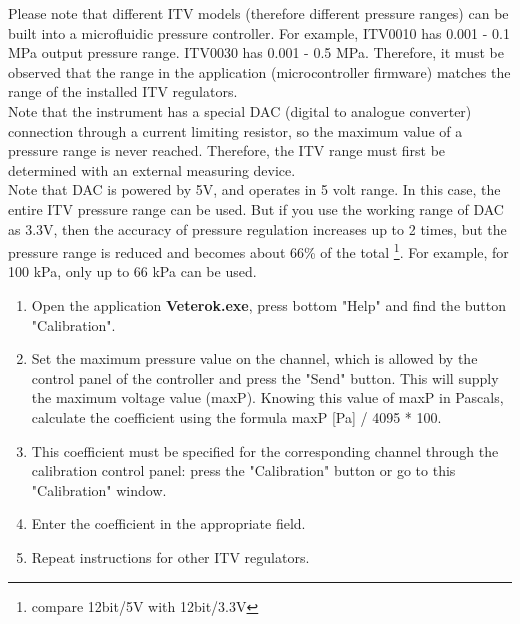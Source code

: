 \documentclass[twoside, 12pt, a4paper]{refart}
\begin{document}
    Please note that different ITV models (therefore different pressure ranges) can be built into a microfluidic pressure controller. For example, ITV0010 has 0.001 - 0.1 MPa output pressure range. ITV0030 has 0.001 - 0.5 MPa. Therefore, it must be observed that the range in the application (microcontroller firmware) matches the range of the installed ITV regulators.\\
    
    Note that the instrument has a special DAC (digital to analogue converter) connection through a current limiting resistor, so the maximum value of a pressure range is never reached. Therefore, the ITV range must first be determined with an external measuring device.\\
    
    Note that DAC is powered by 5V, and operates in 5 volt range. In this case, the entire ITV pressure range can be used. But if you use the working range of DAC as 3.3V, then the accuracy of pressure regulation increases up to 2 times, but the pressure range is reduced and becomes about 66\% of the total \footnote{compare 12bit/5V with 12bit/3.3V}. For example, for 100 kPa, only up to 66 kPa can be used.
        
      \begin{enumerate}
        \item Open the application \textbf{Veterok.exe}, press bottom "Help" and find the button "Calibration".    
        \item Set the maximum pressure value on the channel, which is allowed by the control panel of the controller and press the "Send" button. This will supply the maximum voltage value (maxP). Knowing this value of maxP in Pascals, calculate the coefficient using the formula maxP [Pa] / 4095 * 100.
        \item This coefficient must be specified for the corresponding channel through the calibration control panel: press the "Calibration" button or go to this "Calibration" window.
        \item Enter the coefficient in the appropriate field.
        \item Repeat instructions for other ITV regulators.
      \end{enumerate}
     
      
         
\end{document}
